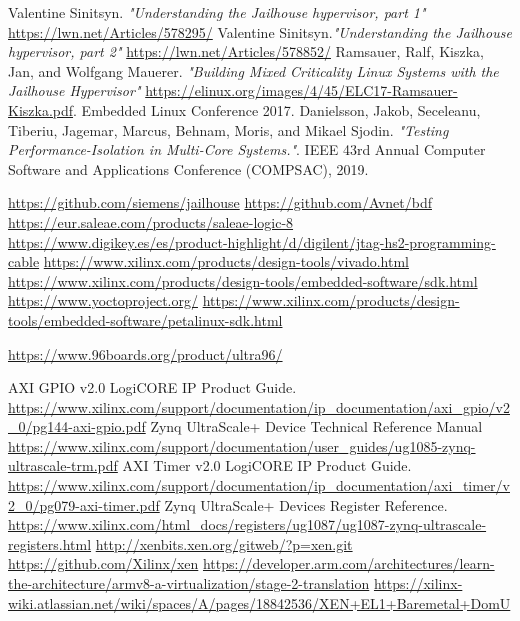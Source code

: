 \documentclass[spanish,12pt,a4paper,oneside]{book}
\begin{document}
\begin{thebibliography}{00}
   Valentine Sinitsyn. \emph{"Understanding the Jailhouse hypervisor, part 1"} \url{https://lwn.net/Articles/578295/}
   Valentine Sinitsyn.\emph{"Understanding the Jailhouse hypervisor, part 2"} \url{https://lwn.net/Articles/578852/}
   Ramsauer, Ralf, Kiszka, Jan, and Wolfgang Mauerer. \emph{"Building Mixed Criticality Linux Systems with the Jailhouse Hypervisor"} \url{https://elinux.org/images/4/45/ELC17-Ramsauer-Kiszka.pdf}. Embedded Linux Conference 2017.
   Danielsson, Jakob, Seceleanu, Tiberiu, Jagemar, Marcus, Behnam, Moris, and Mikael Sjodin. \emph{"Testing Performance-Isolation in Multi-Core Systems."}. IEEE 43rd Annual Computer Software and Applications Conference (COMPSAC), 2019.

   \url{https://github.com/siemens/jailhouse}
   \url{https://github.com/Avnet/bdf}
   \url{https://eur.saleae.com/products/saleae-logic-8}
   \url{https://www.digikey.es/es/product-highlight/d/digilent/jtag-hs2-programming-cable}
   \url{https://www.xilinx.com/products/design-tools/vivado.html}
  \url{https://www.xilinx.com/products/design-tools/embedded-software/sdk.html}
  \url{https://www.yoctoproject.org/}
  \url{https://www.xilinx.com/products/design-tools/embedded-software/petalinux-sdk.html}

   \url{https://www.96boards.org/product/ultra96/}

   AXI GPIO v2.0 LogiCORE IP Product Guide. \url{https://www.xilinx.com/support/documentation/ip_documentation/axi_gpio/v2_0/pg144-axi-gpio.pdf}
   Zynq UltraScale+ Device Technical Reference Manual \url{https://www.xilinx.com/support/documentation/user_guides/ug1085-zynq-ultrascale-trm.pdf}
   AXI Timer v2.0 LogiCORE IP Product Guide. \url{https://www.xilinx.com/support/documentation/ip_documentation/axi_timer/v2_0/pg079-axi-timer.pdf}
   Zynq UltraScale+ Devices Register Reference. \url{https://www.xilinx.com/html_docs/registers/ug1087/ug1087-zynq-ultrascale-registers.html}
   \url{http://xenbits.xen.org/gitweb/?p=xen.git}
   \url{https://github.com/Xilinx/xen}
   \url{https://developer.arm.com/architectures/learn-the-architecture/armv8-a-virtualization/stage-2-translation}
   \url{https://xilinx-wiki.atlassian.net/wiki/spaces/A/pages/18842536/XEN+EL1+Baremetal+DomU}
\end{thebibliography}
\end{document}
